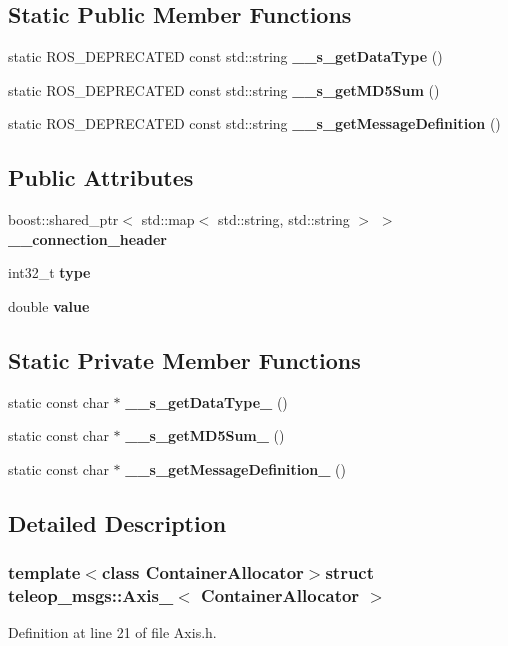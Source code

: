\subsection*{Static Public Member Functions}
\begin{DoxyCompactItemize}
\item 
static ROS\_\-DEPRECATED const std::string {\bf \_\-\_\-s\_\-getDataType} ()
\item 
static ROS\_\-DEPRECATED const std::string {\bf \_\-\_\-s\_\-getMD5Sum} ()
\item 
static ROS\_\-DEPRECATED const std::string {\bf \_\-\_\-s\_\-getMessageDefinition} ()
\end{DoxyCompactItemize}
\subsection*{Public Attributes}
\begin{DoxyCompactItemize}
\item 
boost::shared\_\-ptr$<$ std::map$<$ std::string, std::string $>$ $>$ {\bf \_\-\_\-connection\_\-header}
\item 
int32\_\-t {\bf type}
\item 
double {\bf value}
\end{DoxyCompactItemize}
\subsection*{Static Private Member Functions}
\begin{DoxyCompactItemize}
\item 
static const char $\ast$ {\bf \_\-\_\-s\_\-getDataType\_\-} ()
\item 
static const char $\ast$ {\bf \_\-\_\-s\_\-getMD5Sum\_\-} ()
\item 
static const char $\ast$ {\bf \_\-\_\-s\_\-getMessageDefinition\_\-} ()
\end{DoxyCompactItemize}


\subsection{Detailed Description}
\subsubsection*{template$<$class ContainerAllocator$>$struct teleop\_\-msgs::Axis\_\-$<$ ContainerAllocator $>$}



Definition at line 21 of file Axis.h.



